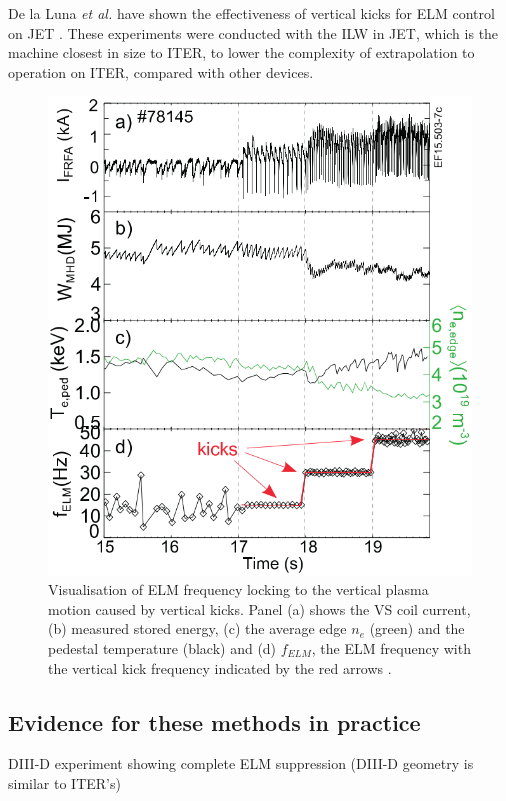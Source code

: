 \documentclass[12pt]{article}  %
\begin{document}
De la Luna \textit{et al.} have shown the effectiveness of vertical kicks for ELM control on JET \cite{DelaLuna2016}. These experiments were conducted with the ILW in JET, which is the machine closest in size to ITER, to lower the complexity of extrapolation to operation on ITER, compared with other devices. 

\begin{figure}
\includegraphics[scale=0.5]{Figures/VKdata.png}
\centering
\caption{Visualisation of ELM frequency locking to the vertical plasma motion caused by vertical kicks. Panel (a) shows the VS coil current, (b) measured stored energy, (c) the average edge $n_e$ (green) and the pedestal temperature (black) and (d) $f_{ELM}$, the ELM frequency with the vertical kick frequency indicated by the red arrows \cite{DelaLuna2016}.}\label{fig:VKdata}
\end{figure}



\subsection{Evidence for these methods in practice}\label{ssec:EIP}
DIII-D experiment showing complete ELM suppression (DIII-D geometry is similar to ITER's)\cite{Mordijck2011}
\end{document}
